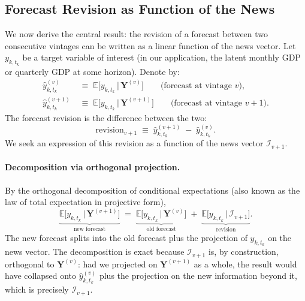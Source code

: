 \documentclass[11pt, a4paper, oneside]{article}
\begin{document}
\subsection{Forecast Revision as Function of the News}

We now derive the central result: the revision of a forecast between
two consecutive vintages can be written as a linear function of the
news vector. Let $y_{k, t_k}$ be a target variable of interest (in
our application, the latent monthly GDP or quarterly GDP at some
horizon). Denote by:
\begin{align*}
\hat{y}_{k, t_k}^{(v)} \;&\equiv\; \mathbb{E}\!\big[y_{k, t_k} \,\big|\, \mathbf{Y}^{(v)}\big] \qquad \text{(forecast at vintage $v$)}, \\
\hat{y}_{k, t_k}^{(v+1)} \;&\equiv\; \mathbb{E}\!\big[y_{k, t_k} \,\big|\, \mathbf{Y}^{(v+1)}\big] \qquad \text{(forecast at vintage $v+1$)}.
\end{align*}
The forecast revision is the difference between the two:
\[
\text{revision}_{v+1} \;\equiv\; \hat{y}_{k, t_k}^{(v+1)} \;-\; \hat{y}_{k, t_k}^{(v)}.
\]
We seek an expression of this revision as a function of the news
vector $\mathcal{I}_{v+1}$.

\paragraph{Decomposition via orthogonal projection.}
By the orthogonal decomposition of conditional expectations (also
known as the law of total expectation in projective form),
\begin{equation}
\underbrace{\mathbb{E}\!\big[y_{k, t_k} \,\big|\, \mathbf{Y}^{(v+1)}\big]}_{\text{new forecast}}
\;=\;
\underbrace{\mathbb{E}\!\big[y_{k, t_k} \,\big|\, \mathbf{Y}^{(v)}\big]}_{\text{old forecast}}
\;+\;
\underbrace{\mathbb{E}\!\big[y_{k, t_k} \,\big|\, \mathcal{I}_{v+1}\big]}_{\text{revision}}.
\label{eq:orthogonal-decomp}
\end{equation}
The new forecast splits into the old forecast plus the projection of
$y_{k, t_k}$ on the news vector. The decomposition is exact because
$\mathcal{I}_{v+1}$ is, by construction, orthogonal to
$\mathbf{Y}^{(v)}$: had we projected on $\mathbf{Y}^{(v+1)}$ as a
whole, the result would have collapsed onto $\hat{y}_{k, t_k}^{(v)}$
plus the projection on the new information beyond it, which is
precisely $\mathcal{I}_{v+1}$.
\end{document}
